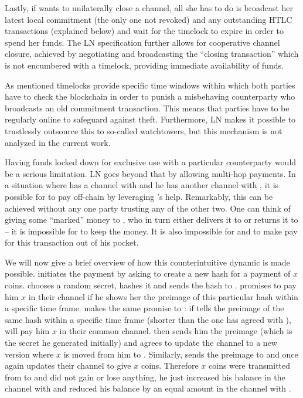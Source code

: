     Lastly, if \alice{} wants to unilaterally close a channel, all she has to do
    is broadcast her latest local commitment (the only one not revoked)
    and any outstanding HTLC transactions (explained below) and wait
    for the timelock to expire in order to spend her funds. The LN specification
    further allows for cooperative channel closure, achieved by negotiating and
    broadcasting the ``closing transaction'' which is not encumbered
    with a timelock, providing immediate availability of funds.

    As mentioned timelocks provide specific time windows within which both
    parties have to check the blockchain in order to punish a misbehaving
    counterparty who  broadcasts an old commitment transaction. This means that
    parties have to be regularly online to safeguard against theft.
    Furthermore, LN makes it possible to trustlessly outsource this to
    so-called watchtowers, but this mechanism is not analyzed in the current
    work.

    Having funds locked down for exclusive use with a particular counterparty
    would be a serious limitation. LN goes beyond that by allowing multi-hop
    payments. In a situation where \alice{} has a channel with \bob{} and he has
    another channel with \charlie{}, it is possible for \alice{} to pay
    \charlie{} off-chain by leveraging \bob's help. Remarkably, this can be
    achieved without any one party trusting any of the other two. One can think
    of \alice{} giving some ``marked'' money to \bob{}, who in turn either
    delivers it to \charlie{} or returns it to \alice{} -- it is impossible for
    \bob{} to keep the money. It is also impossible for \alice{} and \charlie{}
    to make \bob{} pay for this transaction out of his pocket.

    We will now give a brief overview of how this counterintuitive dynamic
    is made possible. \alice{} initiates the payment by asking \charlie{} to
    create a new hash for a payment of $x$ coins. \charlie{} chooses a random
    secret, hashes it and sends the hash to \alice. \alice{} promises \bob{} to
    pay him $x$ in their channel if he shows her the preimage of this particular
    hash within a specific time frame. \bob{} makes the same promise to
    \charlie{}: if \charlie{} tells \bob{} the preimage of the same hash within
    a specific time frame (shorter than the one \bob{} has agreed with
    \alice{}), \bob{} will pay him $x$ in their common channel. \charlie{} then
    sends him the preimage (which is the secret he generated initially) and
    \bob{} agrees to update the channel to a new version where $x$ is moved from
    him to \charlie. Similarly, \bob{} sends the preimage to \alice{} and once
    again \alice{} updates their channel to give \bob{} $x$ coins. Therefore $x$
    coins were transmitted from \alice{} to \charlie{} and \bob{} did not gain
    or lose anything, he just increased his balance in the channel with \alice{}
    and reduced his balance by an equal amount in the channel with \charlie.

